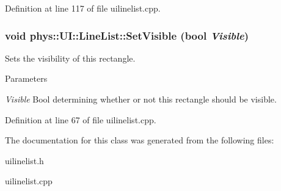 Definition at line 117 of file uilinelist.cpp.

\hypertarget{classphys_1_1UI_1_1LineList_acecf11c133825233afd73d55ba9e4c1d}{
\subsubsection[{SetVisible}]{\setlength{\rightskip}{0pt plus 5cm}void phys::UI::LineList::SetVisible (bool {\em Visible})}}
\label{d7/de8/classphys_1_1UI_1_1LineList_acecf11c133825233afd73d55ba9e4c1d}


Sets the visibility of this rectangle. 


\begin{DoxyParams}{Parameters}
\item[{\em Visible}]Bool determining whether or not this rectangle should be visible. \end{DoxyParams}


Definition at line 67 of file uilinelist.cpp.



The documentation for this class was generated from the following files:\begin{DoxyCompactItemize}
\item 
uilinelist.h\item 
uilinelist.cpp\end{DoxyCompactItemize}
